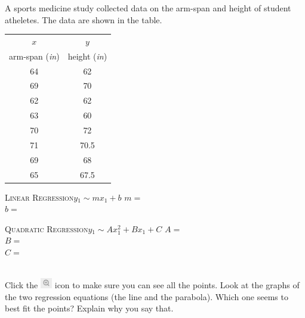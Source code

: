\documentclass[12pt,letterpaper]{memoir}
\begin{document}
\myWideProblemWithContent 
{
    A sports medicine study collected data on the 
    arm-span and height of student atheletes.
    The data are shown in the table.\\[0.5em]
    \begin{minipage}{0.35\textwidth}
        \footnotesize
        \begin{tabular}{cc}
            $x$ & $y$ \\ 
            arm-span ({\itshape in}) & height ({\itshape in}) \\
            \midrule 
            64 & 62 \\
            69 & 70 \\ 
            62 & 62 \\ 
            63 & 60 \\ 
            70 & 72 \\ 
            71 & 70.5 \\ 
            69 & 68 \\ 
            65 & 67.5 \\ 
            \bottomrule
        \end{tabular}
        \end{minipage}
    \begin{minipage}{0.64\textwidth}
        \begin{tcolorbox}[colback=white,width=\textwidth]
            \small
            \scshape{Linear Regression}\hfill$y_1 \sim m x_1 + b$
            \tcblower
            $m =$  \\
            $b =$ 
        \end{tcolorbox}
        \begin{tcolorbox}[colback=white,width=\textwidth]
            \small
            \scshape{Quadratic Regression}\hfill$y_1 \sim A x_1^2 + B x_1 + C$
            \tcblower
            $A =$  \\
            $B =$ \\
            $C =$ 
        \end{tcolorbox}
    \end{minipage}\\[1\onelineskip]
    Click the 
    \includegraphics[width=0.2in]{magnifying-glass-plus.png} 
    icon to make sure you can see all the points.
    Look at the graphs of the two regression equations 
    (the line and the parabola).
    Which one seems to best fit the points?
    Explain why you say that.
    \vspace{0.7in}
}
\end{document}
